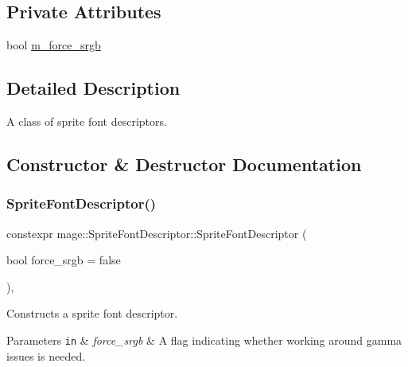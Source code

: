 \subsection*{Private Attributes}
\begin{DoxyCompactItemize}
\item 
bool \hyperlink{classmage_1_1_sprite_font_descriptor_a7fa7230004e671127856e2ab1c27c94a}{m\+\_\+force\+\_\+srgb}
\end{DoxyCompactItemize}


\subsection{Detailed Description}
A class of sprite font descriptors. 

\subsection{Constructor \& Destructor Documentation}
\hypertarget{classmage_1_1_sprite_font_descriptor_a8b7a15c8bd816ee3a5ca01ccba22f9d6}{}\label{classmage_1_1_sprite_font_descriptor_a8b7a15c8bd816ee3a5ca01ccba22f9d6} 
\subsubsection{\texorpdfstring{Sprite\+Font\+Descriptor()}{SpriteFontDescriptor()}\hspace{0.1cm}{\footnotesize\ttfamily [1/3]}}
{\footnotesize\ttfamily constexpr mage\+::\+Sprite\+Font\+Descriptor\+::\+Sprite\+Font\+Descriptor (\begin{DoxyParamCaption}\item[{bool}]{force\+\_\+srgb = {\ttfamily false} }\end{DoxyParamCaption})\hspace{0.3cm}{\ttfamily [explicit]}, {\ttfamily [noexcept]}}

Constructs a sprite font descriptor.


\begin{DoxyParams}[1]{Parameters}
\mbox{\tt in}  & {\em force\+\_\+srgb} & A flag indicating whether working around gamma issues is needed. \\
\hline
\end{DoxyParams}
\hypertarget{classmage_1_1_sprite_font_descriptor_a50e10711f71e443afa80c23b018b084a}{}\label{classmage_1_1_sprite_font_descriptor_a50e10711f71e443afa80c23b018b084a} 
